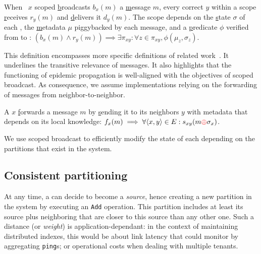 \begin{definition}
  When \Process~$x$ scoped \underline{b}roadcasts $b_x(m)$ a
  \underline{m}essage $m$, every correct \process $y$ within a scope
  \underline{r}eceives $r_y(m)$ and \underline{d}elivers it
  $d_y(m)$. The scope depends on the \underline{s}tate $\sigma$ of
  each \process, the \underline{m}etadata $\mu$ piggybacked by each
  message, and a \underline{p}redicate $\phi$ verified from \process
  to \process:
  $(b_x(m) \wedge r_y(m)) \implies \exists \pi_{xy}: \forall z \in
  \pi_{xy}, \phi(\mu_z, \sigma_z)$.
\end{definition}

This definition encompasses more specific definitions of related
work~\cite{hsiao2005scoped, lue2006scoped, wang2015prodiluvian}. It
underlines the transitive relevance of messages. It also highlights
that the functioning of epidemic propagation is well-aligned with the
objectives of scoped broadcast. As consequence, we assume
implementations relying on the forwarding of messages from
neighbor-to-neighbor.

\begin{definition}
  A \process $x$ \underline{f}orwards a message $m$ by
  \underline{s}ending it to its neighbors $y$ with metadata that
  depends on its local knowledge: $f_x(m) \implies \forall \langle x,
  y\rangle \in E: s_{xy}(m \textcolor{red}{\oplus} \sigma_x)$.
\end{definition}

We use scoped broadcast to efficiently modify the state of each
\process depending on the partitions that exist in the system.



\subsection{Consistent partitioning}
\label{subsec:consistent}

At any time, a \process can decide to become a \emph{source}, hence
creating a new partition in the system by executing an \texttt{Add}
operation. This partition includes at least its source plus
neighboring \processes that are closer to this source than any other
one. Such a distance (or \emph{weight}) is application-dependant: in
the context of maintaining distributed indexes, this would be about
link latency that \nodes could monitor by aggregating \texttt{ping}s;
or operational costs when dealing with multiple tenants.


